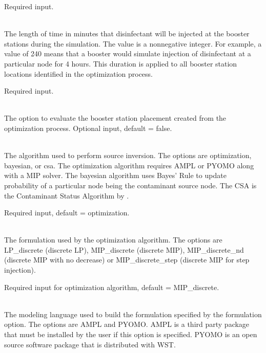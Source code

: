 \begin{description}[topsep=0pt,parsep=0.5em,itemsep=-0.4em]
\begin{description}[topsep=0pt,parsep=0.5em,itemsep=-0.4em]
                Required input.
    \item[{duration}]\hfill
\\The length of time in minutes that disinfectant will be injected at the booster 
                stations during the simulation.	The value is a nonnegative integer. For example, 
                a value of 240 means that a booster would simulate injection of disinfectant 
                at a particular node for 4 hours. This duration is applied to all booster 
                station locations identified in the optimization process.
				
                Required input.
    \item[{evaluate}]\hfill
      \\The option to evaluate the booster station placement created from
      the optimization process.
      Optional input, default = false.
  \end{description}
  \item[{boostersim}]\hfill
  \item[{eventDetection}]\hfill
  \item[{boosterimpact}]\hfill
  \item[{booster quality}]\hfill
  \item[{inversion}]\hfill
  \begin{description}[topsep=0pt,parsep=0.5em,itemsep=-0.4em]
    \item[{algorithm}]\hfill
\\The algorithm used to perform source inversion. The options are 
				optimization, bayesian, or csa. The optimization algorithm requires 
				AMPL or PYOMO along with a MIP solver. The bayesian algorithm 
				uses Bayes' Rule to update probability of a particular node 
				being the contaminant source node. The CSA is the Contaminant
                                Status Algorithm by \citet{csa}.
                
                Required input, default = optimization.
    \item[{formulation}]\hfill
\\The formulation used by the optimization algorithm. The options are 
                LP\_discrete (discrete LP), MIP\_discrete (discrete MIP), 
                MIP\_discrete\_nd (discrete MIP with no decrease) or 
                MIP\_discrete\_step (discrete MIP for step injection).
                
                Required input for optimization algorithm, default = MIP\_discrete.
    \item[{model format}]\hfill
\\The modeling language used to build the formulation specified
                by the formulation option. The options are AMPL and PYOMO. 
				AMPL is a third party package that must be installed by 
				the user if this option is specified. PYOMO is an open source 
				software package that is distributed with WST.
                

\end{description}
\end{description}
